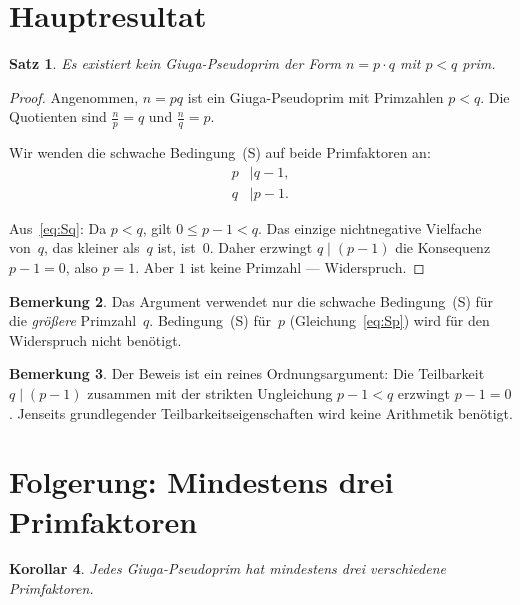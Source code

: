 \documentclass[12pt,a4paper]{amsart}
\newtheorem{theorem}{Satz}[section]
\newtheorem{corollary}[theorem]{Korollar}
\theoremstyle{definition}
\newtheorem{remark}[theorem]{Bemerkung}
\begin{document}
\section{Hauptresultat}

\begin{theorem}
\label{thm:keinpq}
Es existiert kein Giuga-Pseudoprim der Form $n = p \cdot q$ mit $p < q$ prim.
\end{theorem}

\begin{proof}
Angenommen, $n = pq$ ist ein Giuga-Pseudoprim mit Primzahlen $p < q$. Die Quotienten
sind $\tfrac{n}{p} = q$ und $\tfrac{n}{q} = p$.

Wir wenden die schwache Bedingung~(S) auf beide Primfaktoren an:
\begin{align}
  p &\mid q - 1, \label{eq:Sp} \\
  q &\mid p - 1. \label{eq:Sq}
\end{align}

Aus~\eqref{eq:Sq}: Da $p < q$, gilt $0 \le p - 1 < q$.
Das einzige nichtnegative Vielfache von~$q$, das kleiner als~$q$ ist, ist~$0$.
Daher erzwingt $q \mid (p - 1)$ die Konsequenz $p - 1 = 0$, also $p = 1$.
Aber $1$ ist keine Primzahl — Widerspruch.
\end{proof}

\begin{remark}
Das Argument verwendet nur die schwache Bedingung~(S) für die \emph{größere}
Primzahl~$q$. Bedingung~(S) für~$p$ (Gleichung~\eqref{eq:Sp}) wird für den
Widerspruch nicht benötigt.
\end{remark}

\begin{remark}
Der Beweis ist ein reines Ordnungsargument: Die Teilbarkeit $q \mid (p-1)$ zusammen
mit der strikten Ungleichung $p - 1 < q$ erzwingt $p - 1 = 0$. Jenseits grundlegender
Teilbarkeitseigenschaften wird keine Arithmetik benötigt.
\end{remark}

\section{Folgerung: Mindestens drei Primfaktoren}

\begin{corollary}
\label{cor:drei}
Jedes Giuga-Pseudoprim hat mindestens drei verschiedene Primfaktoren.
\end{corollary}
\end{document}
